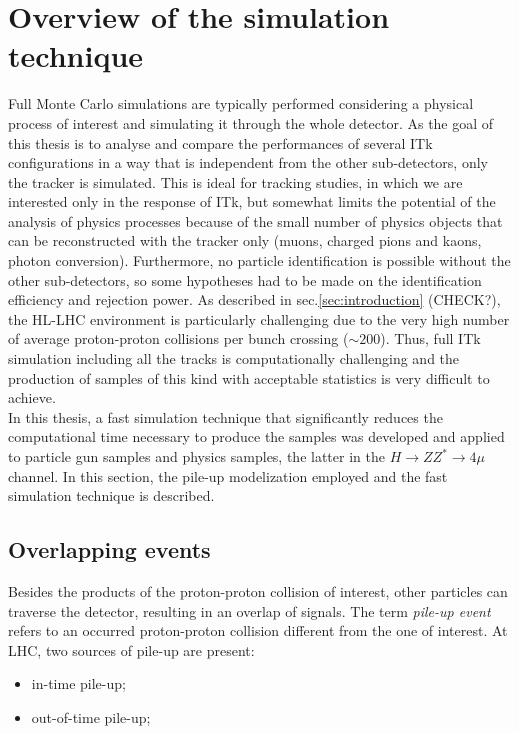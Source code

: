 \documentclass[a4paper,twoside,12pt]{article}
\begin{document}
\clearpage

\section{Overview of the simulation technique}\label{sec:simulation}
Full Monte Carlo simulations are typically performed considering 
a physical process of interest and simulating it through the whole detector. As the goal of this
thesis is to analyse and compare the performances of several ITk configurations in a way that
is independent from the other sub-detectors, only the tracker is simulated. This is 
ideal for tracking studies, in which we are interested only in the response of ITk, but
somewhat 
limits the potential of the analysis of physics processes because of the small number of physics objects that can be reconstructed with the tracker only (muons, charged pions and kaons, photon conversion). Furthermore, no particle identification is possible without the other sub-detectors, so some
 hypotheses had to be made on the identification efficiency and rejection power.
As described in sec.\ref{sec:introduction} (CHECK?), the HL-LHC environment is particularly
challenging due to the very high number of average proton-proton collisions per bunch crossing ($\sim 200$). Thus, full ITk simulation including all the tracks is computationally challenging 
and the production of samples of this kind with acceptable statistics is very difficult
to achieve.\\

In this thesis, a fast simulation technique that
significantly reduces the computational time necessary to produce the samples was developed and applied to particle gun samples and physics samples, the latter 
in the $H \rightarrow ZZ^{*} \rightarrow 4\mu$ channel. In this section,
the pile-up modelization employed and the fast simulation technique is described.

\subsection{Overlapping events}
Besides the products of the proton-proton collision of interest, other particles can traverse the detector, resulting in an overlap of signals. The term \textit{pile-up event} refers to an occurred proton-proton collision different from the one of interest. At LHC, two sources of pile-up are present:

\begin{itemize}
\item in-time pile-up;
\item out-of-time pile-up;
\end{itemize}
\end{document}
